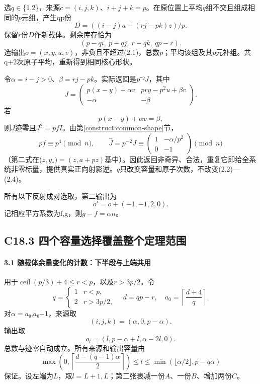 \documentclass[11pt,a4paper]{article}
\theoremstyle{definition}
\numberwithin{equation}{section}
\begin{document}
{选\ensuremath{q}\ensuremath{\in}\{1,2\}，来源\ensuremath{c=(i,j,k)}、\ensuremath{i+j+k=p}。在原位置上平均\ensuremath{q}组不交且组成相同的\ensuremath{p}元组，产生qp份} \[
D=((i-j)a+(rj-pk)z)/p.
\] {保留\ensuremath{r}份\ensuremath{D}作新载体。剩余库存恰为} \[
(p-qi,\ p-qj,\ r-qk,\ qp-r).
\tag{C18.2.1}
\] {选输出\ensuremath{o=(x,y,u,v)}，非负且不超过(2.1)，总数\ensuremath{p}；平均该组及其\ensuremath{p}元补组。共q+2次原子平均，重新得到相同核心形状。}

{令\ensuremath{\alpha =i-j>0}、\ensuremath{\beta =rj-pk}。实际返回是\ensuremath{p}⁻²\ensuremath{J}，其中} \[
J=\begin{pmatrix}
p(x-y)+\alpha v&pry-p^2u+\beta v\\
-\alpha&-\beta
\end{pmatrix}.
\tag{C18.2.2}
\] {若} \[
p(x-y)+\alpha v=\beta,
\tag{C18.2.3}
\] {则\ensuremath{J}迹零且\ensuremath{J^{2}=pfI}。由}第\ref{construct:common-shape}节{，} \[
pf\equiv p^4\pmod n,
\qquad
\widehat J=p^{-2}J\equiv
\begin{pmatrix}1&-\alpha/p^2\\0&-1\end{pmatrix}\pmod n
\tag{C18.2.4}
\] {（第二式在(\ensuremath{z,y_*)=(z,a+pz)}基中）。因此返回非奇异、合法，重复它即给全系统非零标量，提供真实正向射影逆。\ensuremath{q}只改变容量和原子次数，不改变(2.2)---(2.4)。}

{所有以下反射成对选取，第二输出为} \[
o'=o+(-1,-1,2,0).
\] {记相应平方系数为f,g，则\ensuremath{g-f=\alpha n}。}

\subsection*{\texorpdfstring{{C18.3} {四个容量选择覆盖整个定理范围}}{C18.3 四个容量选择覆盖整个定理范围}}\label{C18-h131}

\paragraph*{\texorpdfstring{{3.1} {随载体余量变化的计数：下半段与上端共用}}{3.1 随载体余量变化的计数：下半段与上端共用}}\label{C18-h132}

{用于\ensuremath{\operatorname{ceil}(p/3)+4}\ensuremath{\le}\ensuremath{r<p}，以及\ensuremath{r>3p/2}。令} \[
q=\begin{cases}1&r<p,\\2&r>3p/2,\end{cases}
\quad d=qp-r,\quad
a_0=\left\lceil\frac{d+4}{q}\right\rceil.
\] {对\ensuremath{\alpha =a}₀,\ensuremath{a}₀+1，来源取} \[
\boxed{(i,j,k)=(\alpha,0,p-\alpha).}
\tag{C18.3.1}
\] {输出取} \[
\boxed{o_l=(l,p-\alpha+l,\alpha-2l,0).}
\tag{C18.3.2}
\] {总数与迹零自动成立。所有来源和输出容量由} \[
\boxed{
\max\left(0,\left\lceil\frac{d-(q-1)\alpha}{2}\right\rceil\right)
\le l\le
\min\left(\lfloor\alpha/2\rfloor,p-q\alpha\right)
}
\tag{C18.3.3}
\] {保证。设左端为\ensuremath{L}，取\ensuremath{l=L+1,L}；第二张表减一份\ensuremath{A}、一份\ensuremath{B}、增加两份\ensuremath{C}。}
\end{document}
